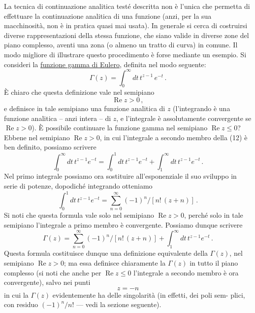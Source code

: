 \documentclass[11pt, a4paper]{book}
\numberwithin{equation}{section}
\begin{document}
La tecnica di continuazione analitica testé descritta non è l'unica che permetta di effettuare la continuazione analitica di una funzione (anzi, per la sua macchinosità, non è in pratica quasi mai usata). In generale si cerca di costruirsi diverse rappresentazioni della stessa funzione, che siano valide in diverse zone del piano complesso, aventi una zona (o almeno un tratto di curva) in comune. Il modo migliore di illustrare questo procedimento è forse mediante un esempio. Si consideri la \underline{funzione gamma di Eulero}, definita nel modo seguente:
\begin{equation}
\Gamma(z) = \int_0^{\infty} dt\, t^{z-1}\, e^{-t}\,. \tag{12}
\end{equation}
È chiaro che questa definizione vale nel semipiano
\begin{equation}
\operatorname{Re} z > 0\,, \tag{13}
\end{equation}
e definisce in tale semipiano una funzione analitica di $z$ (l'integrando è una funzione analitica -- anzi intera -- di $z$, e l'integrale è assolutamente convergente se $\operatorname{Re} z > 0$). È possibile continuare la funzione gamma nel semipiano $\operatorname{Re} z \leq 0$? Ebbene nel semipiano $\operatorname{Re} z > 0$, in cui l'integrale a secondo membro della (12) è ben definito, possiamo scrivere
\begin{equation}
\int_0^{\infty} dt\, t^{z-1} e^{-t} = \int_0^{1} dt\, t^{z-1} e^{-t} + \int_1^{\infty} dt\, t^{z-1} e^{-t}\,. \tag{14}
\end{equation}
Nel primo integrale possiamo ora sostituire all'esponenziale il suo sviluppo in serie di potenze, dopodiché integrando otteniamo
\[
\int_0^1 dt\, t^{z-1} e^{-t} = \sum_{n=0}^{\infty} (-1)^n / \left[n!\,(z+n)\right]\,.
\]
Si noti che questa formula vale solo nel semipiano $\operatorname{Re} z > 0$, perché solo in tale semipiano l'integrale a primo membro è convergente. Possiamo dunque scrivere
\begin{equation}
\Gamma(z) = \sum_{n=0}^{\infty} (-1)^n/\left[n!\,(z+n)\right] + \int_1^{\infty} dt\, t^{z-1} e^{-t}\,. \tag{15}
\end{equation}
Questa formula costituisce dunque una definizione equivalente della $\Gamma(z)$, nel semipiano $\operatorname{Re} z > 0$; ma essa definisce chiaramente la $\Gamma(z)$ in tutto il piano complesso (si noti che anche per $\operatorname{Re} z \leq 0$ l'integrale a secondo membro è ora convergente), salvo nei punti
\begin{equation}
z = -n \tag{16}
\end{equation}
in cui la $\Gamma(z)$ evidentemente ha delle singolarità (in effetti, dei poli sem-%
plici, con residuo $(-1)^n/n!$ — vedi la sezione seguente).
\end{document}
